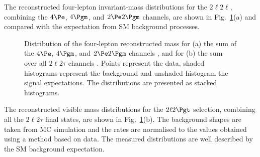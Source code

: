 The reconstructed four-lepton invariant-mass distributions for the $2\ell 2\ell$, combining the
$4\Pe$, $4\Pgm$, and  $2\Pe2\Pgm$ channels, are shown in Fig.~\ref{fig:Mass4l-2l2tau}(a) 
and compared with the expectation from SM background processes.
\begin{figure}[htbp]
\begin{center}
%
%
\caption{ 
Distribution of the four-lepton reconstructed mass for (a) the sum of 
the $4\Pe$, $4\Pgm$, and $2\Pe2\Pgm$ channels , and for (b) the sum over all
$2\ell2\tau$ channels .
Points represent the data, shaded histograms represent the background 
and unshaded histogram the signal expectations.
The distributions are presented as stacked histograms.}
\label{fig:Mass4l-2l2tau}
\end{center}
\end{figure}
The reconstructed visible mass distributions for the $2\ell2\Pgt$ selection, combining all
the $2\ell2\tau$ final states, are shown in Fig.~\ref{fig:Mass4l-2l2tau}(b).
The background shapes are taken from MC simulation and the rates are normalised 
to the values obtained using a method based on data.   
The measured distributions are well described by the SM background expectation.

